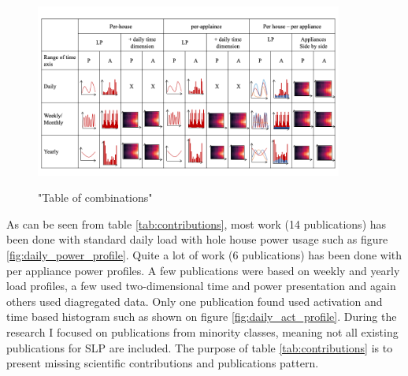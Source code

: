 \begin{figure}[H]
	\centering
	\caption{"Table of combinations"}
	\includegraphics[width=0.9\textwidth]{Figures/profile_sketches/Slide14.png}
	\label{fig:map_fig}
\end{figure}

As can be seen from table \ref{tab:contributions}, most work (14 publications) has been done with standard daily load with
hole house power usage such as figure \ref{fig:daily_power_profile}. 
Quite a lot of work (6 publications) has been done with per appliance power profiles.
A few publications were based on weekly and yearly load profiles,
a few used two-dimensional time and power presentation and again others used diagregated data.
Only one publication found used activation and time based histogram such as 
shown on figure \ref{fig:daily_act_profile}. During the research I focused on publications
from minority classes, meaning not all existing publications for SLP are included. 
The purpose of table \ref{tab:contributions} is to present missing scientific contributions 
and publications pattern.  

